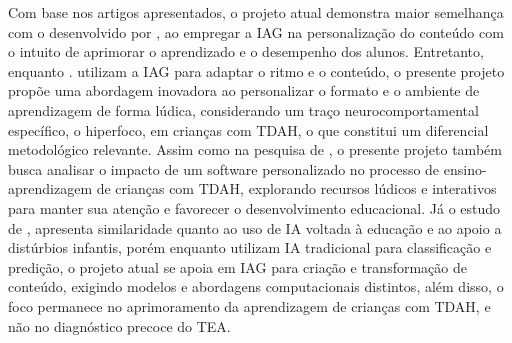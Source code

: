 Com base nos artigos apresentados, o projeto atual demonstra maior semelhança com o desenvolvido por \cite{Moller2024}, ao empregar a IAG na personalização do conteúdo com o intuito de aprimorar o aprendizado e o desempenho dos alunos. Entretanto, enquanto \cite{Moller2024}. utilizam a IAG para adaptar o ritmo e o conteúdo, o presente projeto propõe uma abordagem inovadora ao personalizar o formato e o ambiente de aprendizagem de forma lúdica, considerando um traço neurocomportamental específico, o hiperfoco, em crianças com TDAH, o que constitui um diferencial metodológico relevante. Assim como na pesquisa de \cite{Santos2020}, o presente projeto também busca analisar o impacto de um software personalizado no processo de ensino-aprendizagem de crianças com TDAH, explorando recursos lúdicos e interativos para manter sua atenção e favorecer o desenvolvimento educacional. Já o estudo de \cite{Lauriano2024}, apresenta similaridade quanto ao uso de IA voltada à educação e ao apoio a distúrbios infantis, porém enquanto \cite{Lauriano2024} utilizam IA tradicional para classificação e predição, o projeto atual se apoia em IAG para criação e transformação de conteúdo, exigindo modelos e abordagens computacionais distintos, além disso, o foco permanece no aprimoramento da aprendizagem de crianças com TDAH, e não no diagnóstico precoce do TEA.
